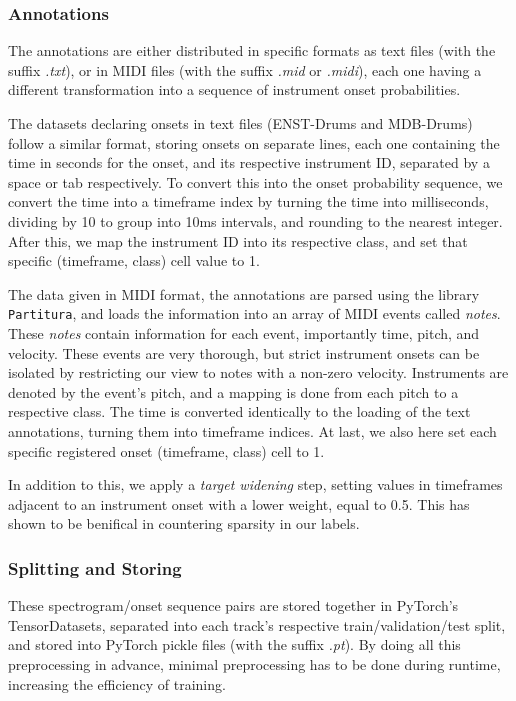 \subsubsection{Annotations}

The annotations are either distributed in specific formats as text files (with the suffix \textit{.txt}), or in MIDI files (with the suffix \textit{.mid} or \textit{.midi}), each one having a different transformation into a sequence of instrument onset probabilities.

The datasets declaring onsets in text files (ENST-Drums and MDB-Drums) follow a similar format, storing onsets on separate lines, each one containing the time in seconds for the onset, and its respective instrument ID, separated by a space or tab respectively. To convert this into the onset probability sequence, we convert the time into a timeframe index by turning the time into milliseconds, dividing by 10 to group into 10ms intervals, and rounding to the nearest integer. After this, we map the instrument ID into its respective class, and set that specific (timeframe, class) cell value to 1.

The data given in MIDI format, the annotations are parsed using the library \texttt{Partitura}, and loads the information into an array of MIDI events called \textit{notes}. These \textit{notes} contain information for each event, importantly time, pitch, and velocity. These events are very thorough, but strict instrument onsets can be isolated by restricting our view to notes with a non-zero velocity. Instruments are denoted by the event's pitch, and a mapping is done from each pitch to a respective class. The time is converted identically to the loading of the text annotations, turning them into timeframe indices. At last, we also here set each specific registered onset (timeframe, class) cell to 1.

In addition to this, we apply a \textit{target widening} step, setting values in timeframes adjacent to an instrument onset with a lower weight, equal to 0.5. This has shown to be benifical in countering sparsity in our labels.~\cite{9747048, signals4040042}

\subsubsection{Splitting and Storing}

These spectrogram/onset sequence pairs are stored together in PyTorch's TensorDatasets, separated into each track's respective train/validation/test split, and stored into PyTorch pickle files (with the suffix \textit{.pt}). By doing all this preprocessing in advance, minimal preprocessing has to be done during runtime, increasing the efficiency of training.

